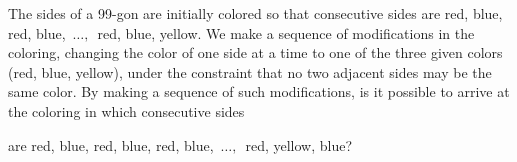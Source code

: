 The sides of a 99-gon are initially colored so that consecutive sides are red, blue, red, blue, $\,\ldots, \,$ red, blue, yellow. We make a sequence of modifications in the coloring, changing the color of one side at a time to one of the three given colors (red, blue, yellow), under the constraint that no two adjacent sides may be the same color.  By making a sequence of such modifications, is it possible to arrive at the coloring in which consecutive sides

are red, blue, red, blue, red, blue, $\, \ldots, \,$ red, yellow, blue?